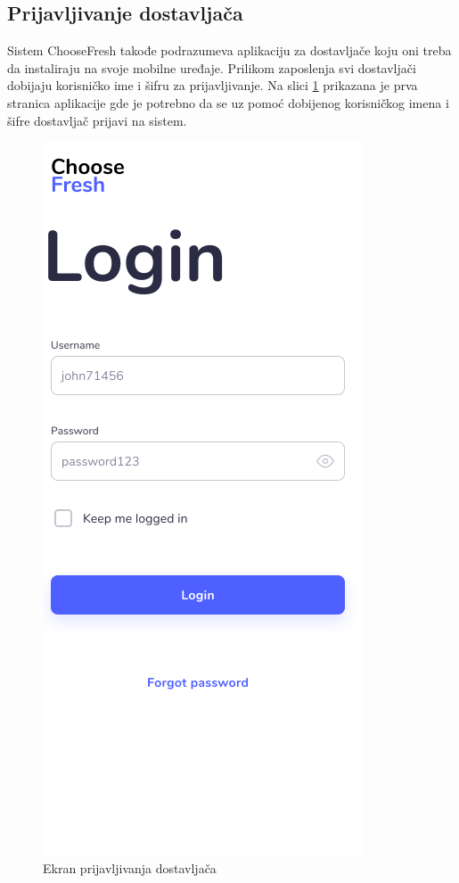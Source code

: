 \subsection{Prijavljivanje dostavljača}


Sistem ChooseFresh takođe podrazumeva aplikaciju za dostavljače koju oni treba da instaliraju na svoje mobilne uređaje. Prilikom zaposlenja svi dostavljači dobijaju korisničko ime i šifru za prijavljivanje. Na slici \ref{fig:DeliverymanLogIn} prikazana je prva stranica aplikacije gde je potrebno da se uz pomoć dobijenog korisničkog imena i šifre dostavljač prijavi na sistem.  

\begin{figure}[H]
	\begin{center}
		\includegraphics[scale=0.3]{UI/deliveryman_login.png}
    		\caption{Ekran prijavljivanja dostavljača}
    \label{fig:DeliverymanLogIn}
    \end{center}
\end{figure}